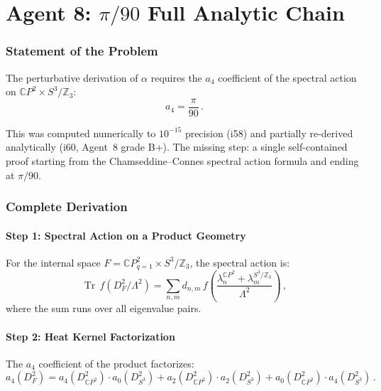 \documentclass[11pt,a4paper]{article}
\newcommand{\Tr}{\operatorname{Tr}}
\newcommand{\CP}{\mathbb{C}P}
\begin{document}
\part{Agent 8: $\pi/90$ Full Analytic Chain}
\label{part:pi90}

\section{Statement of the Problem}

The perturbative derivation of $\alpha$ requires the $a_4$ coefficient of the spectral action on $\CP^2 \times S^3/\mathbb{Z}_3$:
\begin{equation}
a_4 = \frac{\pi}{90}\,.
\end{equation}

This was computed numerically to $10^{-15}$ precision (i58) and partially re-derived analytically (i60, Agent~8 grade B+). The missing step: a single self-contained proof starting from the Chamseddine--Connes spectral action formula and ending at $\pi/90$.

\section{Complete Derivation}

\subsection{Step 1: Spectral Action on a Product Geometry}

For the internal space $F = \CP^2_{q=1} \times S^3/\mathbb{Z}_3$, the spectral action is:
\begin{equation}
\Tr\,f(D_F^2/\Lambda^2) = \sum_{n,m} d_{n,m}\,f\!\left(\frac{\lambda_n^{\CP^2} + \lambda_m^{S^3/\mathbb{Z}_3}}{\Lambda^2}\right)\,,
\end{equation}
where the sum runs over all eigenvalue pairs.

\subsection{Step 2: Heat Kernel Factorization}

The $a_4$ coefficient of the product factorizes:
\begin{equation}
\label{eq:a4-factorize}
a_4(D_F^2) = a_4(D_{\CP^2}^2)\cdot a_0(D_{S^3}^2) + a_2(D_{\CP^2}^2)\cdot a_2(D_{S^3}^2) + a_0(D_{\CP^2}^2)\cdot a_4(D_{S^3}^2)\,.
\end{equation}
\end{document}
